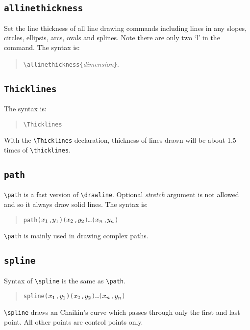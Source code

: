 \documentclass[11pt]{article}
\begin{document}
\subsection{\tt \BS allinethickness}
Set the line thickness of all line drawing commands including
lines in any slopes, circles, ellipsis, arcs, ovals and splines.
Note there are only two `l' in the command. The syntax is:
\begin{quote}
\verb|\allinethickness{|{\em dimension}\verb|}|.
\end{quote}


\subsection{\tt \BS Thicklines}
The syntax is:
\begin{quote}
\verb|\Thicklines|
\end{quote}
With the \verb|\Thicklines| declaration, thickness of lines drawn
will be about 1.5 times of \verb|\thicklines|.


\subsection{\tt \BS path}
\verb|\path| is a fast version of \verb|\drawline|. Optional {\em
stretch\/} argument is not allowed and so it always draw solid
lines. The syntax is:
\begin{quote}
\begin{alltt}
\BS{}path(\(x\sb{1}\),\(y\sb{1}\))(\(x\sb{2}\),\(y\sb{2}\))\ldots(\(x\sb{n}\),\(y\sb{n}\))
\end{alltt}
\end{quote}
\verb|\path| is mainly used in drawing complex paths.


\subsection{\tt \BS spline}
Syntax of \verb|\spline| is the same as \verb|\path|.
\begin{quote}
\begin{alltt}
\BS{}spline(\(x\sb{1}\),\(y\sb{1}\))(\(x\sb{2}\),\(y\sb{2}\))\ldots(\(x\sb{n}\),\(y\sb{n}\))
\end{alltt}
\end{quote}
\verb|\spline| draws an Chaikin's curve which passes through only
the first and last point. All other points are control points
only.
\end{document}
